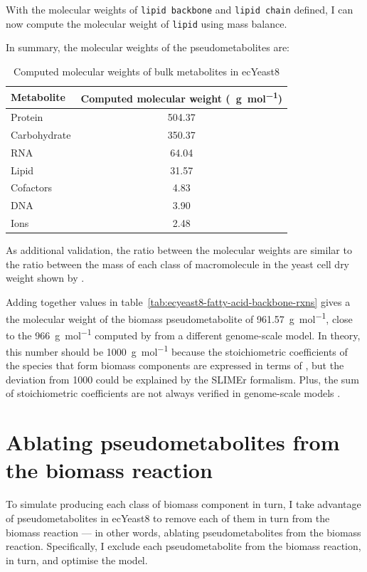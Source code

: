 With the molecular weights of \texttt{lipid backbone} and \texttt{lipid chain} defined, I can now compute the molecular weight of \texttt{lipid} using mass balance.

In summary, the molecular weights of the pseudometabolites are:
\begin{table}[ht]
  \centering
  \begin{tabular}{lS}
    Metabolite & {Computed molecular weight (\SI{}{\gram~\mol^{-1}})} \\
    \hline
    Protein & 504.37 \\
    Carbohydrate & 350.37 \\
    RNA & 64.04 \\
    Lipid & 31.57 \\
    Cofactors & 4.83 \\
    DNA & 3.90 \\
    Ions & 2.48
  \end{tabular}
  \caption{Computed molecular weights of bulk metabolites in ecYeast8}
  \label{tab:ecyeast8-mol-weights}
\end{table}

As additional validation, the ratio between the molecular weights are similar to the ratio between the mass of each class of macromolecule in the yeast cell dry weight shown by \textcite{canelasVivoDatadrivenFramework2011}.

Adding together values in table~\ref{tab:ecyeast8-fatty-acid-backbone-rxns} gives a the molecular weight of the biomass pseudometabolite of \SI{961.57}{\gram~\mol^{-1}}, close to the \SI{966}{\gram~\mol^{-1}} computed by \textcite{takhaveevTemporalSegregationBiosynthetic2023} from a different genome-scale model.
In theory, this number should be \SI{1000}{\gram~\mol^{-1}} because the stoichiometric coefficients of the species that form biomass components are expressed in terms of \SI{}{\mmolgdw} \parencite{thieleProtocolGeneratingHighquality2010, palssonSystemsBiologyConstraintbased2015}, but the deviation from 1000 could be explained by the SLIMEr formalism.
Plus, the sum of stoichiometric coefficients are not always verified in genome-scale models \parencite{chanStandardizingBiomassReactions2017}.


\section{Ablating pseudometabolites from the biomass reaction}
\label{sec:model-yeast8-pseudometabolites}

To simulate producing each class of biomass component in turn,
I take advantage of pseudometabolites in ecYeast8 to remove each of them in turn from the biomass reaction ---
in other words, ablating pseudometabolites from the biomass reaction.
Specifically, I exclude each pseudometabolite from the biomass reaction, in turn, and optimise the model.

